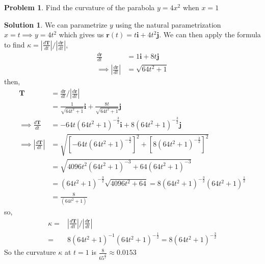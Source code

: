 \documentclass[10pt]{article}
\theoremstyle{definition}
\newtheorem{problem}{Problem}
\newtheorem{soln}{Solution}
\newcommand{\ui}{\mathbf{i}}
\newcommand{\uj}{\mathbf{j}}
\begin{document}
\begin{problem}
Find the curvature of the parabola $y = 4x^2$ when $x = 1$
\end{problem}
\begin{soln}
  We can parametrize $y$ using the natural parametrization $x=t\implies y=4t^2$ which gives us $\mathbf{r}(t)=t\ui+4t^2\uj$. We can then apply the formula to find $\kappa=\left|\frac{d\mathbf{T}}{dt}\right|/\left|\frac{d\mathbf{r}}{dt}\right|$,
  \begin{align*}
    \frac{d\mathbf{r}}{dt}                       & =1\ui+8t\uj     \\
    \implies \left|\frac{d\mathbf{r}}{dt}\right| & =\sqrt{64t^2+1}
  \end{align*}
  then,
  \begin{align*}
    \mathbf{T}                                   & =\frac{d\mathbf{r}}{dt}/\left|\frac{d\mathbf{r}}{dt}\right|                                                                  \\
                                                 & =\frac{1}{\sqrt{64t^2+1}}\ui+\frac{8t}{\sqrt{64t^2+1}}\uj                                                                    \\
    \implies \frac{d\mathbf{T}}{dt}              & =-64t\left(64t^2+1\right)^{-\frac{3}{2}}\ui+8\left(64t^2+1\right)^{-\frac{3}{2}}\uj                                          \\
    \implies \left|\frac{d\mathbf{T}}{dt}\right| & =\sqrt{\left[-64t\left(64t^2+1\right)^{-\frac{3}{2}}\right]^2+\left[8\left(64t^2+1\right)^{-\frac{3}{2}}\right]^2}           \\
                                                 & =\sqrt{4096t^2\left(64t^2+1\right)^{-3}+64\left(64t^2+1\right)^{-3}}                                                         \\
                                                 & =\left(64t^2+1\right)^{-\frac{3}{2}}\sqrt{4096t^2+64}=8\left(64t^2+1\right)^{-\frac{3}{2}}\left(64t^2+1\right)^{\frac{1}{2}} \\
                                                 & =\frac{8}{\left(64t^2+1\right)}
  \end{align*}
  so,
  \begin{align*}
    \kappa= & \left|\frac{d\mathbf{T}}{dt}\right|/\left|\frac{d\mathbf{r}}{dt}\right|                            \\
    =       & 8\left(64t^2+1\right)^{-1}\left(64t^2+1\right)^{-\frac{1}{2}}=8\left(64t^2+1\right)^{-\frac{3}{2}}
  \end{align*}
  So the curvature $\kappa$ at $t=1$ is $\displaystyle\frac{8}{65^{\frac{3}{2}}}\approx0.0153$
\end{soln}
\newpage
\end{document}
